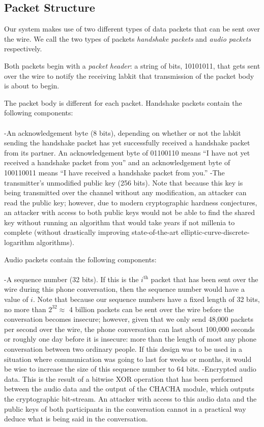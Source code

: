 \documentclass[a4paper]{article}
\begin{document}
\subsection{Packet Structure}

Our system makes use of two different types of data packets that can be sent over the wire. We call the two types of packets \emph{handshake packets} and \emph{audio packets} respectively. 


Both packets begin with a \emph{packet header}: a string of bits, 10101011, that gets sent over the wire to notify the receiving labkit that transmission of the packet body is about to begin. 

The packet body is different for each packet. Handshake packets contain the following components: \\ \\
-An acknowledgement byte (8 bits), depending on whether or not the labkit sending the handshake packet has yet successfully received a handshake packet from its partner. An acknowledgement byte of 01100110 means ``I have not yet received a handshake packet from you'' and an acknowledgement byte of 100110011 means ``I have received a handshake packet from you.'' 
-The transmitter's unmodified public key (256 bits). Note that because this key is being transmitted over the channel without any modification, an attacker can read the public key; however, due to modern cryptographic hardness conjectures, an attacker with access to both public keys would not be able to find the shared key without running an algorithm that would take years if not millenia to complete (without drastically improving state-of-the-art elliptic-curve-discrete-logarithm algorithms).

Audio packets contain the following components: \\ \\
-A sequence number (32 bits). If this is the $i^{\textrm{th}}$ packet that has been sent over the wire during this phone conversation, then the sequence number would have a value of $i$. Note that because our sequence numbers have a fixed length of 32 bits, no more than $2^32 \approx $ 4 billion packets can be sent over the wire before the conversation becomes insecure; however, given that we only send 48,000 packets per second over the wire, the phone conversation can last about 100,000 seconds or roughly one day before it is insecure: more than the length of most any phone conversation between two ordinary people. If this design was to be used in a situation where communication was going to last for weeks or months, it would be wise to increase the size of this sequence number to 64 bits.
-Encrypted audio data. This is the result of a bitwise XOR operation that has been performed between the audio data and the output of the CHACHA module, which outputs the cryptographic bit-stream. An attacker with access to this audio data and the public keys of both participants in the conversation cannot in a practical way deduce what is being said in the conversation.
\end{document}
